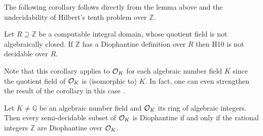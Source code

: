 The following corollary follows directly from the lemma above and the
undecidability of Hilbert's tenth problem over $ℤ$.

\begin{cor}
  Let $R \supseteq ℤ$ be a computable integral domain, whose quotient field is
  not algebraically closed. If $ℤ$ has a Diophantine definition over $R$ then
  \textsc{H10} is not decidable over $R$.
\end{cor}

Note that this corollary applies to $\mathcal{O}_{K}$ for each algebraic number field
$K$ since the quotient field of $\mathcal{O}_{K}$ is (isomorphic to) $K$. In fact, one
can even strengthen the result of the corollary in this case \cite[cf.][§~11]{Davis1976}.

\begin{thm}\label{thm:CE sets are Diophantine}
  Let \(K ≠ ℚ\) be an algebraic number field and \(\mathcal{O}_{K}\) its ring of
  algebraic integers. Then every semi-decidable subset of \(\mathcal{O}_{K}\) is
  Diophantine if and only if the rational integers \(ℤ\) are Diophantine over
  \(\mathcal{O}_{K}\).
\end{thm}
